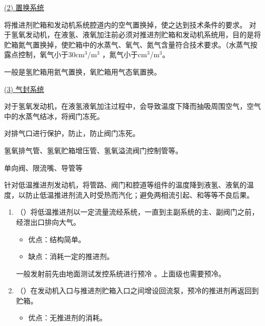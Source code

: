 \underline{(2) \hspace*{0.3em} 置换系统}
\vspace*{0.5em}

\blue[功能] \quad 将推进剂贮箱和发动机系统腔道内的空气置换掉，使之达到技术条件的要求。
\blue[置换及要求] \quad 对于氢氧发动机，在液氢、液氧加注前必须对推进剂贮箱和发动机系统用\red[氦气进行严格的系统置换] ，目的是将贮箱氮气置换掉，使贮箱中的水蒸气、氧气、氮气含量符合技术要求。（水蒸气按露点控制，氧气小于30$\text{cm}^3$/$\text{m}^3$ ，氮气小于$\text{cm}^3$/$\text{m}^3$。

\blue[置换气体] \quad 一般是氢贮箱用氦气置换，氧贮箱用气态氧置换。
\vspace*{0.5em}

\underline{(3) \hspace*{0.3em} 气封系统}
\vspace*{0.5em}

\blue[低温抽吸效应] \quad 对于氢氧发动机，在液氢液氧加注过程中，会导致温度下降而抽吸周围空气，空气中的水蒸气结冰，将阀门冻死。

\blue[气封的作用] \quad 对排气口进行\red[正气压]保护，防止，防止阀门冻死。

\blue[气封的部位] \quad 氢氧排气管、氢氧贮箱增压管、氢氧溢流阀门控制管等。

\blue[组成] \quad 单向阀、限流嘴、导管等

\clearpage

\sssection[预冷系统]

\blue[作用] \quad 针对低温推进剂发动机，将管路、阀门和腔道等组件的温度降到液氢、液氧的温度，以防止低温推进剂流入时受热而汽化；避免两相流引起\red[泵失速]、\red[流量]和\red[压强波动]等等不良后果。

\blue[预冷系统]
\vspace*{-0.5em}
\begin{enumerate}[\hspace*{3em} $\bigstar$]
	\item {}（）\quad 将低温推进剂以一定流量流经系统，一直到主副系统的主、副阀门之前，经泄出口排向大气。\vspace*{-0.5em}
	\begin{itemize}
		\item 优点：结构简单。\vspace*{-0.5em}
		\item 缺点：消耗一定的推进剂。
	\end{itemize}
	一般发射前先由地面测试发控系统进行预冷 。上面级也需要预冷。
	\item {}（）\quad 在发动机入口与推进剂贮箱入口之间增设回流泵，预冷的推进剂再返回到贮箱。\vspace*{-0.5em}
	\begin{itemize}
		\item 优点：无推进剂的消耗。
	\end{itemize}
	\vspace*{-0.5em}
\end{enumerate}
\vspace*{0.5em}


